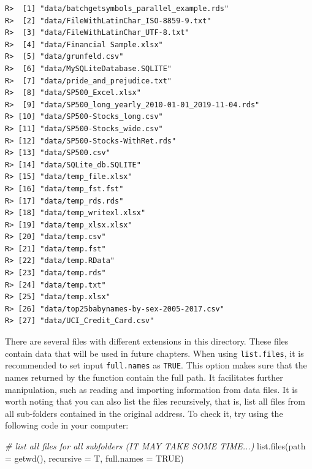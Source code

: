\documentclass[
  12pt,
]{book}
\newenvironment{Shaded}{\begin{snugshade}}{\end{snugshade}}
\newcommand{\AttributeTok}[1]{\textcolor[rgb]{0.61,0.61,0.61}{#1}}
\newcommand{\CommentTok}[1]{\textcolor[rgb]{0.37,0.37,0.37}{\textit{#1}}}
\newcommand{\ConstantTok}[1]{\textcolor[rgb]{0,0,0}{#1}}
\newcommand{\FunctionTok}[1]{\textcolor[rgb]{0,0,0}{#1}}
\newcommand{\NormalTok}[1]{#1}
\begin{document}
\begin{verbatim}
R>  [1] "data/batchgetsymbols_parallel_example.rds"       
R>  [2] "data/FileWithLatinChar_ISO-8859-9.txt"           
R>  [3] "data/FileWithLatinChar_UTF-8.txt"                
R>  [4] "data/Financial Sample.xlsx"                      
R>  [5] "data/grunfeld.csv"                               
R>  [6] "data/MySQLiteDatabase.SQLITE"                    
R>  [7] "data/pride_and_prejudice.txt"                    
R>  [8] "data/SP500_Excel.xlsx"                           
R>  [9] "data/SP500_long_yearly_2010-01-01_2019-11-04.rds"
R> [10] "data/SP500-Stocks_long.csv"                      
R> [11] "data/SP500-Stocks_wide.csv"                      
R> [12] "data/SP500-Stocks-WithRet.rds"                   
R> [13] "data/SP500.csv"                                  
R> [14] "data/SQLite_db.SQLITE"                           
R> [15] "data/temp_file.xlsx"                             
R> [16] "data/temp_fst.fst"                               
R> [17] "data/temp_rds.rds"                               
R> [18] "data/temp_writexl.xlsx"                          
R> [19] "data/temp_xlsx.xlsx"                             
R> [20] "data/temp.csv"                                   
R> [21] "data/temp.fst"                                   
R> [22] "data/temp.RData"                                 
R> [23] "data/temp.rds"                                   
R> [24] "data/temp.txt"                                   
R> [25] "data/temp.xlsx"                                  
R> [26] "data/top25babynames-by-sex-2005-2017.csv"        
R> [27] "data/UCI_Credit_Card.csv"
\end{verbatim}

There are several files with different extensions in this directory. These files contain data that will be used in future chapters. When using \texttt{list.files}, it is recommended to set input \texttt{full.names} as \texttt{TRUE}. This option makes sure that the names returned by the function contain the full path. It facilitates further manipulation, such as reading and importing information from data files. It is worth noting that you can also list the files recursively, that is, list all files from all sub-folders contained in the original address. To check it, try using the following code in your computer:

\begin{Shaded}
\begin{Highlighting}[]
\CommentTok{\# list all files for all subfolders (IT MAY TAKE SOME TIME...)}
\FunctionTok{list.files}\NormalTok{(}\AttributeTok{path =} \FunctionTok{getwd}\NormalTok{(), }\AttributeTok{recursive =}\NormalTok{ T, }\AttributeTok{full.names =} \ConstantTok{TRUE}\NormalTok{)}
\end{Highlighting}
\end{Shaded}
\end{document}
